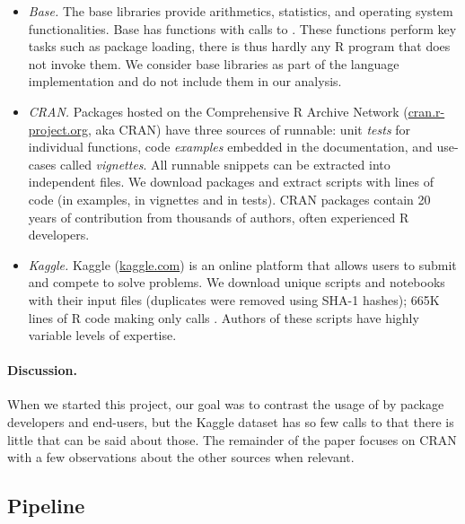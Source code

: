 \documentclass[review,screen,acmsmall]{acmart}%
\begin{document}
\begin{itemize}[$-$]

\item \emph{Base.} The \BasePackages base libraries provide arithmetics,
  statistics, and operating system functionalities. Base has \BaseFunsWithEvals
  functions with \BaseEvalCallSites calls to \eval. These functions perform key
  tasks such as package loading, there is thus hardly any R program that does
  not invoke them. We consider base libraries as part of the language
  implementation and do not include them in our analysis.

\item \emph{CRAN.} Packages hosted on the Comprehensive R Archive Network
  ({\small \url{cran.r-project.org}}, aka CRAN) have three sources of runnable:
  unit \emph{tests} for individual functions, code \emph{examples} embedded in
  the documentation, and use-cases called \emph{vignettes}. All runnable
  snippets can be extracted into independent files. We download \CranPackages
  packages and extract \CranRunnableScripts scripts with \CranRunnableCode
  lines of code (\CranRunnableCodeExamplesRnd in examples,
  \CranRunnableCodeVignettesRnd in vignettes and \CranRunnableCodeTestsRnd in
  tests). CRAN packages contain 20 years of contribution from
  thousands of authors, often experienced R developers.

\item \emph{Kaggle.} Kaggle ({\small \url{kaggle.com}}) is an online platform
  that allows users to submit and compete to solve problems. We download
  \KaggleUnique unique scripts and notebooks with their input files
  (\KaggleDuplicates duplicates were removed using SHA-1 hashes); 665K lines of
  R code making only \KaggleWithEvals calls \eval. Authors of these scripts
  have highly variable levels of expertise.

\end{itemize}


\paragraph{Discussion.} When we started this project, our goal was to contrast the
usage of \eval by package developers and end-users, but the Kaggle dataset has
so few calls to \eval that there is little that can be said about those. The
remainder of the paper focuses on CRAN with a few observations about the other
sources when relevant.


\subsection{Pipeline}
\end{document}
